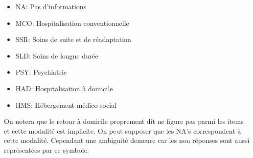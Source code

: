 \documentclass[12pt,english,french,twoside]{book}\usepackage[]{graphicx}\usepackage[]{color}
\begin{document}
\begin{itemize}
  \item NA:    Pas d'informations
  \item MCO:		Hospitalisation conventionnelle
  \item SSR:		Soins de suite et de réadaptation
  \item SLD:		Soins de longue durée
  \item PSY: 		Psychiatrie
  \item HAD:		Hospitalisation à domicile
  \item HMS:		Hébergement médico-social
\end{itemize}

On notera que le retour à domicile proprement dit ne figure pas parmi les items et cette modalité est implicite. On peut supposer que les NA's correspondent à cette modalité. Cependant une ambiguité demeure car les non réponses sont aussi représentées par ce symbole.
\end{document}
